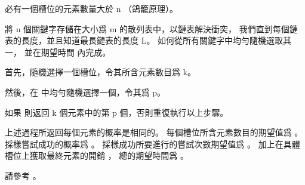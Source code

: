 \startANSWER
必有一個槽位的元素數量大於 n （鴿籠原理）。
\stopANSWER

\startEXERCISE
將 n 個關鍵字存儲在大小爲 m 的散列表中，以鏈表解決衝突，
我們直到每個鏈表的長度，並且知道最長鏈表的長度 L。
如何從所有關鍵字中均勻隨機選取其一，
並在期望時間  內完成。
\stopEXERCISE

\startANSWER
首先，隨機選擇一個槽位，令其所含元素數目爲 k。

然後，在  中均勻隨機選擇一個，令其爲 p。

如果  則返回 k 個元素中的第 p 個，否則重復執行以上步驟。

上述過程所返回每個元素的概率是相同的。
每個槽位所含元素數目的期望值爲 。
採樣嘗試成功的概率爲 。
採樣成功所要進行的嘗試次數期望值爲 。
加上在具體槽位上獲取最終元素的開銷 ，
總的期望時間爲 。

請參考 。
\stopANSWER

\stopsection
